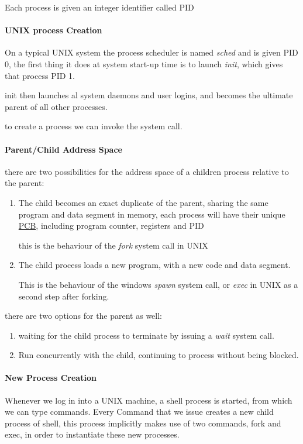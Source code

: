 \documentclass[openright, twoside]{report}
\theoremstyle{definition}
\theoremstyle{example}
\begin{document}
				Each process is given an integer identifier called PID

			\paragraph{UNIX process Creation} On a typical UNIX system the process scheduler is named \emph{sched}
			and is given PID 0, the first thing it does at system start-up time is to launch \emph{init}, which gives that process PID 1.

			init then launches al system daemons and user logins, and becomes the ultimate parent of all other processes.

			to create a process we can invoke the  system call. 

			\paragraph{Parent/Child Address Space} there are two possibilities for the address space of a children process relative to 
			the parent:
			\begin{enumerate}
				\item The child becomes an exact duplicate of the parent, sharing the 
				same program and data segment in memory,
				each process will have their unique \hyperref[par:PCB]{PCB}, including 
				program counter, registers and PID 

				this is the behaviour of the \emph{fork} system call in UNIX

				\item The child process loads a new program, with a new code and data segment.

				This is the behaviour of the windows \emph{spawn} system call, or \emph{exec} in UNIX as 
				a second step after forking.

			\end{enumerate}

			there are two options for the parent as well:
			\begin{enumerate}
				\item waiting for the child process to terminate by issuing a \emph{wait} system call. 
				\item Run concurrently with the child, continuing to process without being blocked. 
			\end{enumerate}

			\paragraph{New Process Creation}
			Whenever we log in into a UNIX machine, a shell process is started, from which 
			we can type commands.
			Every Command that we issue creates a new child process of shell, this process 
			implicitly makes use of two commands,
			fork and exec, in order to instantiate these new processes.
\end{document}
